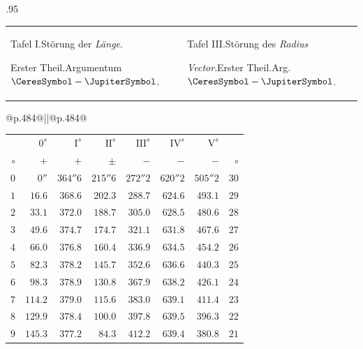 \begin{GaussVICeresFrame}{.95}
\begin{tabular}{@{}p{.484\linewidth}@{\hspace{2pt}}||@{\hspace{2pt}}p{.484\linewidth}@{}}
{\centering
Tafel I.\enspace Störung der \textit{Länge}.\par
Erster Theil.\enspace Argumentum $\CeresSymbol-\JupiterSymbol$.\par}
&
{\centering
Tafel III.\enspace Störung des \textit{Radius}\par
\textit{Vector}.\enspace Erster Theil.\enspace Arg. $\CeresSymbol-\JupiterSymbol$.\par}
\tabularnewline
\end{tabular}\par
\medskip
\begin{tabular}{@{}p{.484\linewidth}@{\hspace{2pt}}||@{\hspace{2pt}}p{.484\linewidth}@{}}
{\centering\fontsize{8}{10}\selectfont
\setlength{\tabcolsep}{.9pt}\renewcommand{\arraystretch}{1.08}
\begin{tabular}{r@{\GaussVICeresRule}r|r|r|r|r|r@{\GaussVICeresRule}r}
 & $0^s$ & $\mathrm{I}^s$ & $\mathrm{II}^s$ & $\mathrm{III}^s$ & $\mathrm{IV}^s$ & $\mathrm{V}^s$ & \\
$\circ$ & $+$ & $+$ & $\pm$ & $-$ & $-$ & $-$ & $\circ$ \\\hline
$0$ & $0''$ & $364''6$ & $215''6$ & $272''2$ & $620''2$ & $505''2$ & $30$ \\[3pt]
$1$ & $16.6$ & $368.6$ & $202.3$ & $288.7$ & $624.6$ & $493.1$ & $29$ \\
$2$ & $33.1$ & $372.0$ & $188.7$ & $305.0$ & $628.5$ & $480.6$ & $28$ \\
$3$ & $49.6$ & $374.7$ & $174.7$ & $321.1$ & $631.8$ & $467.6$ & $27$ \\
$4$ & $66.0$ & $376.8$ & $160.4$ & $336.9$ & $634.5$ & $454.2$ & $26$ \\
$5$ & $82.3$ & $378.2$ & $145.7$ & $352.6$ & $636.6$ & $440.3$ & $25$ \\[3pt]
$6$ & $98.3$ & $378.9$ & $130.8$ & $367.9$ & $638.2$ & $426.1$ & $24$ \\
$7$ & $114.2$ & $379.0$ & $115.6$ & $383.0$ & $639.1$ & $411.4$ & $23$ \\
$8$ & $129.9$ & $378.4$ & $100.0$ & $397.8$ & $639.5$ & $396.3$ & $22$ \\
$9$ & $145.3$ & $377.2$ & $84.3$ & $412.2$ & $639.4$ & $380.8$ & $21$ \\

\end{tabular}}
\end{tabular}
\end{GaussVICeresFrame}
